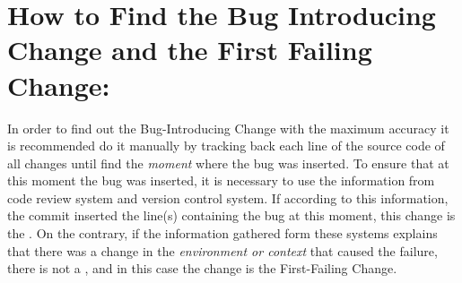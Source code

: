 \documentclass[a4paper, 12pt]{book}
\begin{document}




\section{How to Find the Bug Introducing Change and the First Failing Change:}
In order to find out the Bug-Introducing Change with the maximum accuracy it is recommended do it manually by tracking back each line of the source code of all changes until find the \emph{moment} where the bug was inserted. To ensure that at this moment the bug was inserted, it is necessary to use the information from code review system and version control system. If according to this information, the commit inserted the line(s) containing the bug at this moment, this change is the \BIC. On the contrary, if the information gathered form these systems explains that there was a change in the \emph{environment or context} that caused the failure, there is not a \BIC, and in this case the change is the First-Failing Change. 
\end{document}
